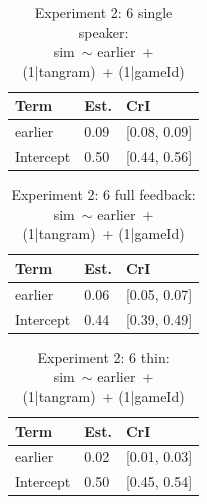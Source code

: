 \documentclass[
  english,
  a4paper,
]{article}
\begin{document}
\begin{table}[h!]

\caption{\label{tab:unnamed-chunk-15}Experiment 2: 6 single speaker:\\ sim~$\sim$ earlier~+ (1|tangram)~+ (1|gameId)}
\centering
\begin{tabular}[t]{lll}
\toprule
Term & Est. & CrI\\
\midrule
earlier & 0.09 & {}[0.08, 0.09]\\
Intercept & 0.50 & {}[0.44, 0.56]\\
\bottomrule
\end{tabular}
\end{table}

\begin{table}[h!]

\caption{\label{tab:unnamed-chunk-15}Experiment 2: 6 full feedback:\\ sim~$\sim$ earlier~+ (1|tangram)~+ (1|gameId)}
\centering
\begin{tabular}[t]{lll}
\toprule
Term & Est. & CrI\\
\midrule
earlier & 0.06 & {}[0.05, 0.07]\\
Intercept & 0.44 & {}[0.39, 0.49]\\
\bottomrule
\end{tabular}
\end{table}

\begin{table}[h!]

\caption{\label{tab:unnamed-chunk-15}Experiment 2: 6 thin:\\ sim~$\sim$ earlier~+ (1|tangram)~+ (1|gameId)}
\centering
\begin{tabular}[t]{lll}
\toprule
Term & Est. & CrI\\
\midrule
earlier & 0.02 & {}[0.01, 0.03]\\
Intercept & 0.50 & {}[0.45, 0.54]\\
\bottomrule
\end{tabular}
\end{table}
\end{document}
